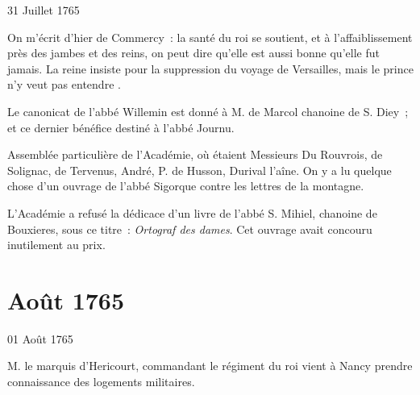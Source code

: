                      \begin{diary}{31 Juillet 1765}{}
                        
                         On m'écrit d'hier de Commercy : \og la santé
                              du roi se soutient, et
                              à l'affaiblissement près des jambes et des reins, on peut dire qu'elle est
                              aussi bonne qu'elle fut jamais. La reine insiste
                              pour la suppression du voyage de Versailles,
                              mais le prince n'y veut pas entendre \fg{}. \bigskip
        
        
                         Le canonicat de l'abbé Willemin est donné
                           à M. de Marcol chanoine de
                              S. Diey ; et ce
                           dernier bénéfice destiné à l'abbé
                              Journu. \bigskip
        
        
                         Assemblée particulière de l'Académie, où étaient
                           Messieurs
                           Du Rouvrois, de Solignac, de
                              Tervenus,
                           André, P.
                              de Husson, Durival
                              l'aîne. On
                           y a lu quelque chose d'un ouvrage de
                                 l'abbé
                                 Sigorque contre les lettres de la montagne. \bigskip
        
        
                        
                           L'Académie a refusé la dédicace
                           d'un
                           livre de l'abbé S.
                              Mihiel, chanoine de Bouxieres,
                           sous ce titre : \emph{Ortograf des dames}.
                           Cet ouvrage avait concouru inutilement
                           au prix. \bigskip
        
        
                     \end{diary}
                  \chapter*{Août 1765}
                     
                     
                     
                     \begin{diary}{01 Août 1765}{}
                        
                        
                           M. le marquis d'Hericourt, commandant le
                           régiment du roi vient à Nancy
                           prendre
                           connaissance des logements militaires. \bigskip
        
        
                     \end{diary}

